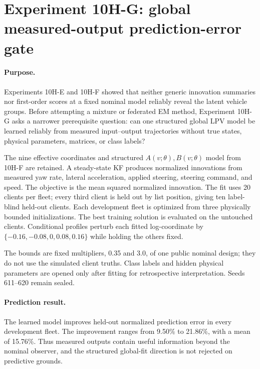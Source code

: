 \section{Experiment 10H-G: global measured-output prediction-error gate}
\label{sec:experiment10hg}

\paragraph{Purpose.}
Experiments 10H-E and 10H-F showed that neither generic innovation summaries
nor first-order scores at a fixed nominal model reliably reveal the latent
vehicle groups. Before attempting a mixture or federated EM method,
Experiment 10H-G asks a narrower prerequisite question: can one structured
global LPV model be learned reliably from measured input--output trajectories
without true states, physical parameters, matrices, or class labels?

The nine effective coordinates and structured $A(v;\theta),B(v;\theta)$ model
from 10H-F are retained. A steady-state KF produces normalized innovations
from measured yaw rate, lateral acceleration, applied steering, steering
command, and speed. The objective is the mean squared normalized innovation.
The fit uses 20 clients per fleet; every third client is held out by list
position, giving ten label-blind held-out clients. Each development fleet is
optimized from three physically bounded initializations. The best training
solution is evaluated on the untouched clients. Conditional profiles perturb
each fitted log-coordinate by $\{-0.16,-0.08,0,0.08,0.16\}$ while holding the
others fixed.

The bounds are fixed multipliers, 0.35 and 3.0, of one public nominal design;
they do not use the simulated client truths. Class labels and hidden physical
parameters are opened only after fitting for retrospective interpretation.
Seeds 611--620 remain sealed.

\paragraph{Prediction result.}
The learned model improves held-out normalized prediction error in every
development fleet. The improvement ranges from 9.50\% to 21.86\%, with a mean
of 15.76\%. Thus measured outputs contain useful information beyond the
nominal observer, and the structured global-fit direction is not rejected on
predictive grounds.

